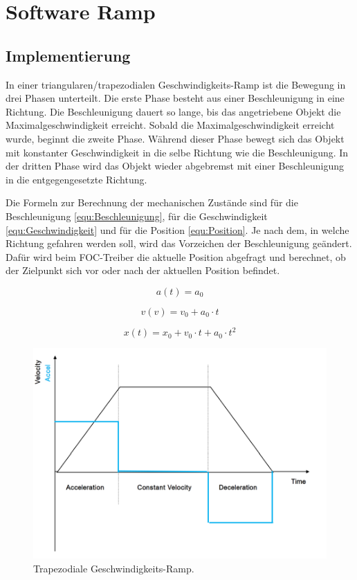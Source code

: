 \section{Software Ramp}

\subsection{Implementierung}

In einer triangularen/trapezodialen Geschwindigkeits-Ramp ist die Bewegung in drei Phasen unterteilt. Die erste Phase besteht aus einer Beschleunigung in eine Richtung. Die Beschleunigung dauert so lange, bis das angetriebene Objekt die Maximalgeschwindigkeit erreicht. Sobald die Maximalgeschwindigkeit erreicht wurde, beginnt die zweite Phase. Während dieser Phase bewegt sich das Objekt mit konstanter Geschwindigkeit in die selbe Richtung wie die Beschleunigung. In der dritten Phase wird das Objekt wieder abgebremst mit einer Beschleunigung in die entgegengesetzte Richtung.

Die Formeln zur Berechnung der mechanischen Zustände sind für die Beschleunigung \ref{equ:Beschleunigung}, für die Geschwindigkeit \ref{equ:Geschwindigkeit} und für die Position \ref{equ:Position}. Je nach dem, in welche Richtung gefahren werden soll, wird das Vorzeichen der Beschleunigung geändert. Dafür wird beim FOC-Treiber die aktuelle Position abgefragt und berechnet, ob der Zielpunkt sich vor oder nach der aktuellen Position befindet.

\begin{equation}
a(t) = a_0
\label{equ:Beschleunigung}
\end{equation}

\begin{equation}
v(v) = v_0 + a_0 \cdot t
\label{equ:Geschwindigkeit}
\end{equation}

\begin{equation}
x(t) = x_0 + v_0 \cdot t + a_0 \cdot t ^ 2
\label{equ:Position}
\end{equation}

\begin{figure}[H]
\center
\includegraphics[width = 0.8 \textwidth]{graphics/Trapezodial_Ramp}
\caption{Trapezodiale Geschwindigkeits-Ramp. \cite{abb_application_2012}}
\label{fig:Trapezodial_Ramp}
\end{figure}

